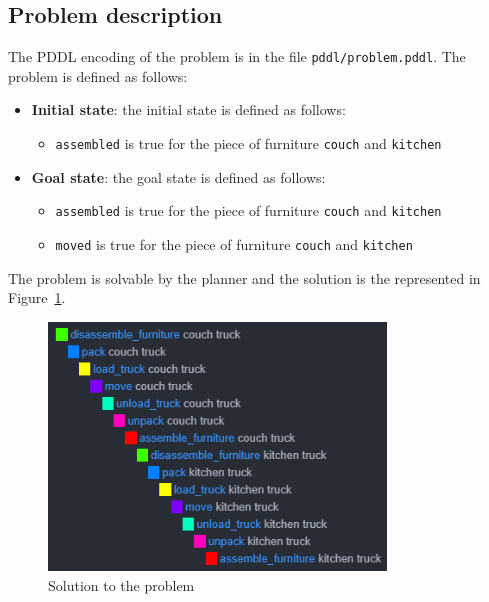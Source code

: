 \documentclass[12pt]{article}
\begin{document}
    \subsection{Problem description}\label{subsec:pddl-problem}
    The PDDL encoding of the problem is in the file \texttt{pddl/problem.pddl}.
    The problem is defined as follows:
    \begin{itemize}
        \item \textbf{Initial state}: the initial state is defined as follows:
        \begin{itemize}
            \item \texttt{assembled} is true for the piece of furniture \texttt{couch} and \texttt{kitchen}
        \end{itemize}
        \item \textbf{Goal state}: the goal state is defined as follows:
        \begin{itemize}
            \item \texttt{assembled} is true for the piece of furniture \texttt{couch} and \texttt{kitchen}
            \item \texttt{moved} is true for the piece of furniture \texttt{couch} and \texttt{kitchen}
        \end{itemize}
    \end{itemize}
    The problem is solvable by the planner and the solution is the represented in Figure~\ref{fig:pddl-solution}.
    \begin{figure}[ht]
        \centering
        \includegraphics[width=0.8\textwidth]{../img/pddl_problem_solution}
        \caption{Solution to the problem}
        \label{fig:pddl-solution}
    \end{figure}
\end{document}
